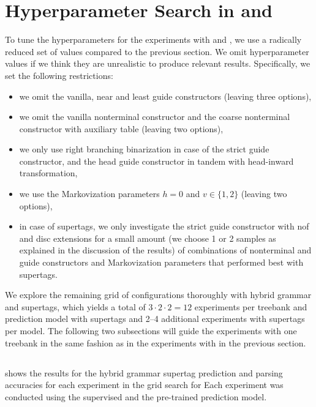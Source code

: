 \documentclass[../../document.tex]{subfiles}
\begin{document}
    \section{Hyperparameter Search in   and }\label{sec:gridsearch:other}
    To tune the hyperparameters for the experiments with  and \tiger{}, we use a radically reduced set of values compared to the previous section.
    We omit hyperparameter values if we think they are unrealistic to produce relevant results.
    Specifically, we set the following restrictions:
    \begin{itemize}
        \item we omit the vanilla, near and least guide constructors (leaving three options),
        \item we omit the vanilla nonterminal constructor and the coarse nonterminal constructor with auxiliary table (leaving two options),
        \item we only use right branching binarization in case of the strict guide constructor, and the head guide constructor in tandem with head-inward transformation,
        \item we use the Markovization parameters \(h = 0\) and \(v \in \{1,2\}\) (leaving two options),
        \item in case of  supertags, we only investigate the strict guide constructor with nof and disc extensions for a small amount (we choose 1 or 2 samples as explained in the discussion of the results) of combinations of nonterminal and guide constructors and Markovization parameters that performed best with  supertags.
    \end{itemize}

    We explore the remaining grid of configurations thoroughly with hybrid grammar and  supertags, which yields a total of $3 \cdot 2 \cdot 2 = 12$ experiments per treebank and prediction model with  supertags and 2--4 additional experiments with  supertags per model.
    The following two subsections will guide the experiments with one treebank in the same fashion as in the experiments with \negra{} in the previous section.

    \subsection{}
     shows the results for the hybrid grammar supertag prediction and parsing accuracies for each experiment in the grid search for 
    Each experiment was conducted using the supervised and the pre-trained prediction model.
\end{document}
